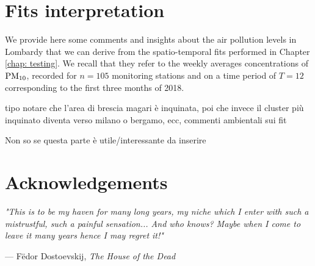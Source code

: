 \documentclass[12pt,	%
	a4paper,		%
	twoside,		%
	openright,		%
	titlepage,%
	]{book}
\theoremstyle{definition}
\begin{document}




\chapter{Fits interpretation}
We provide here some comments and insights about the air pollution levels in Lombardy that we can derive from the spatio-temporal fits performed in Chapter \ref{chap: testing}. We recall that they refer to the weekly averages concentrations of $\text{PM}_{10}$, recorded for $n=105$ monitoring stations and on a time period of $T=12$ corresponding to the first three months of 2018.

tipo notare che l'area di brescia magari è inquinata, poi che invece il cluster più inquinato diventa verso milano o bergamo, ecc, commenti ambientali sui fit

Non so se questa parte è utile/interessante da inserire

\cleardoublepage
\backmatter
% 

% 
\cleardoublepage
\printbibliography

%

\cleardoublepage
{}
\chapter*{Acknowledgements}

\setlength{}
\epigraph{\itshape 
"This is to be my haven for many long years, my niche which I enter with such a mistrustful, such a painful sensation... And who knows? Maybe when I come to leave it many years hence I may regret it!"
}{--- F\"{e}dor Dostoevskij, \textit{The House of the Dead}}
\end{document}
